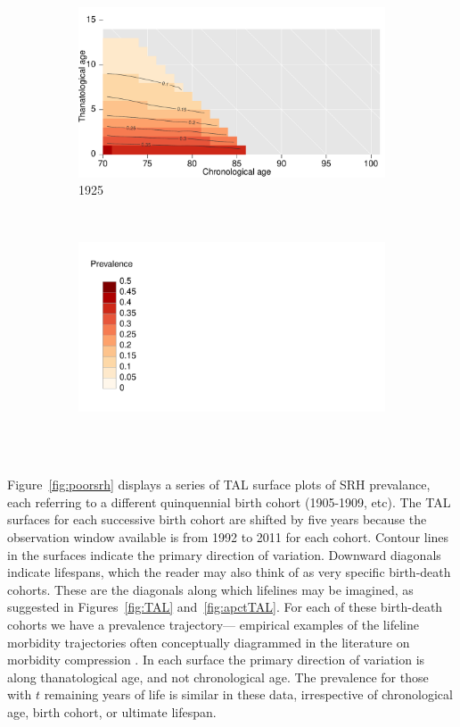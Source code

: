 \documentclass[12pt,oneside,a4paper]{article} %
\theoremstyle{definition}
\begin{document}
\begin{figure}[h!]
\begin{subfigure}{.46\textwidth}
\centering
\caption{1925}
\vspace{-1em}
\label{fig:srh1925}
\includegraphics[scale=0.32]{Figures/TALapplication/srhpoor1925.pdf}
\end{subfigure}
~
\begin{subfigure}{.46\textwidth}
\centering
\caption*{~}
\vspace{-1em}
\label{fig:srhlegend}
\includegraphics[scale=0.32]{Figures/TALapplication/Legend.pdf}
\end{subfigure}
\end{figure} 

Figure~\ref{fig:poorsrh} displays a series of TAL surface plots of SRH
prevalance, each referring to a different quinquennial birth cohort (1905-1909,
etc). The TAL surfaces for
each successive birth cohort are shifted by five years because the observation
window available is from 1992 to 2011 for each cohort. Contour lines in the
surfaces indicate the primary direction of variation. Downward
diagonals indicate lifespans, which the reader may also think of as very
specific birth-death cohorts. These are the diagonals along which lifelines may
be imagined, as suggested in Figures~\ref{fig:TAL} and~\ref{fig:apctTAL}. For each
of these birth-death cohorts we have a prevalence trajectory--- empirical examples of the lifeline morbidity trajectories often conceptually diagrammed in the literature on morbidity compression
\citep[e.g.,][]{fries2005frailty}.
In each surface the primary direction of variation is along thanatological age,
and not chronological age. The prevalence for those with $t$ remaining years of
life is similar in these data, irrespective of chronological age, birth cohort,
or ultimate lifespan.
\end{document}
